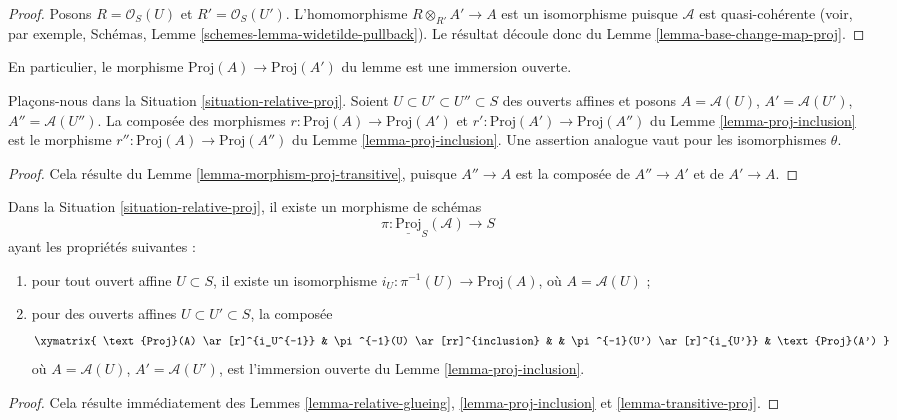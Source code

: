 \begin{proof}
Posons $R = \mathcal{O}_S(U)$ et $R' = \mathcal{O}_S(U')$.
L'homomorphisme $R \otimes_{R'} A' \to A$ est un isomorphisme puisque
$\mathcal{A}$ est quasi-cohérente (voir, par exemple, Schémas,
Lemme \ref{schemes-lemma-widetilde-pullback}).
Le résultat découle donc du
Lemme \ref{lemma-base-change-map-proj}.
\end{proof}

\noindent
En particulier, le morphisme $\text{Proj}(A) \to \text{Proj}(A')$ du lemme
est une immersion ouverte.

\begin{lemma}
\label{lemma-transitive-proj}
Plaçons-nous dans la Situation \ref{situation-relative-proj}.
Soient $U \subset U' \subset U'' \subset S$
des ouverts affines et posons
$A = \mathcal{A}(U)$, $A' = \mathcal{A}(U')$, $A'' = \mathcal{A}(U'')$.
La composée des morphismes $r : \text{Proj}(A) \to \text{Proj}(A')$ et
$r' : \text{Proj}(A') \to \text{Proj}(A'')$ du
Lemme \ref{lemma-proj-inclusion} est le morphisme
$r'' : \text{Proj}(A) \to \text{Proj}(A'')$ du
Lemme \ref{lemma-proj-inclusion}. Une assertion analogue vaut pour les
isomorphismes $\theta$.
\end{lemma}

\begin{proof}
Cela résulte du Lemme
\ref{lemma-morphism-proj-transitive}, puisque
$A'' \to A$ est la composée de $A'' \to A'$ et de $A' \to A$.
\end{proof}

\begin{lemma}
\label{lemma-glue-relative-proj}
Dans la Situation \ref{situation-relative-proj}, il existe un morphisme
de schémas
$$
\pi : \underline{\text{Proj}}_S(\mathcal{A}) \longrightarrow S
$$
ayant les propriétés suivantes :
\begin{enumerate}
\item pour tout ouvert affine $U \subset S$, il existe un isomorphisme
$i_U : \pi^{-1}(U) \to \text{Proj}(A)$, où $A = \mathcal{A}(U)$ ;
\item pour des ouverts affines $U \subset U' \subset S$, la composée
$$
\xymatrix{
\text{Proj}(A) \ar[r]^{i_U^{-1}} &
\pi^{-1}(U) \ar[rr]^{inclusion} & &
\pi^{-1}(U') \ar[r]^{i_{U'}} &
\text{Proj}(A')
}
$$
où $A = \mathcal{A}(U)$, $A' = \mathcal{A}(U')$, est l'immersion ouverte du
Lemme \ref{lemma-proj-inclusion}.
\end{enumerate}
\end{lemma}

\begin{proof}
Cela résulte immédiatement des
Lemmes \ref{lemma-relative-glueing},
\ref{lemma-proj-inclusion} et
\ref{lemma-transitive-proj}.
\end{proof}

